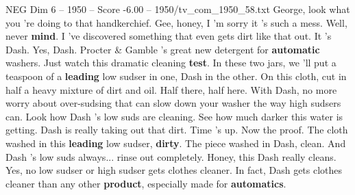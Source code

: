 \begin{textsample}{NEG Dim 6 – 1950 – Score -6.00 – 1950/tv\_com\_1950\_58.txt}  \label{ex:f6_neg_081}
George, look what you 're doing to that handkerchief.
Gee, honey, I 'm sorry it 's such a mess.
Well, never \textbf{mind}.
I 've discovered something that even gets dirt like that out.
It 's Dash.
Yes, Dash.
Procter \& Gamble 's great new detergent for \textbf{automatic} washers.
Just watch this dramatic cleaning \textbf{test}.
In these two jars, we 'll put a teaspoon of a \textbf{leading} low sudser in one, Dash in the other.
On this cloth, cut in half a heavy mixture of dirt and oil.
Half there, half here.
With Dash, no more worry about over-sudsing that can slow down your washer the way high sudsers can.
Look how Dash 's low suds are cleaning.
See how much darker this water is getting.
Dash is really taking out that dirt.
Time 's up.
Now the proof.
The cloth washed in this \textbf{leading} low sudser, \textbf{dirty}.
The piece washed in Dash, clean.
And Dash 's low suds always... rinse out completely.
Honey, this Dash really cleans.
Yes, no low sudser or high sudser gets clothes cleaner.
In fact, Dash gets clothes cleaner than any other \textbf{product}, especially made for \textbf{automatics}.

\end{textsample}
